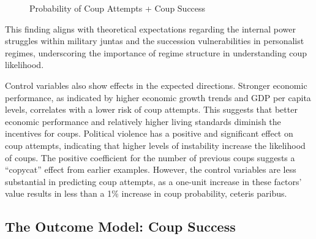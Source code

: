 \documentclass[
  12pt,
]{report}
\begin{document}
\begin{figure}


\caption{\label{fig-margins}Probability of Coup Attempts + Coup Success}

\end{figure}%

This finding aligns with theoretical expectations regarding the internal
power struggles within military juntas and the succession
vulnerabilities in personalist regimes, underscoring the importance of
regime structure in understanding coup likelihood.

Control variables also show effects in the expected directions. Stronger
economic performance, as indicated by higher economic growth trends and
GDP per capita levels, correlates with a lower risk of coup attempts.
This suggests that better economic performance and relatively higher
living standards diminish the incentives for coups. Political violence
has a positive and significant effect on coup attempts, indicating that
higher levels of instability increase the likelihood of coups. The
positive coefficient for the number of previous coups suggests a
``copycat'' effect from earlier examples. However, the control variables
are less substantial in predicting coup attempts, as a one-unit increase
in these factors' value results in less than a 1\% increase in coup
probability, ceteris paribus.

\subsection{The Outcome Model: Coup
Success}\label{the-outcome-model-coup-success}
\end{document}
